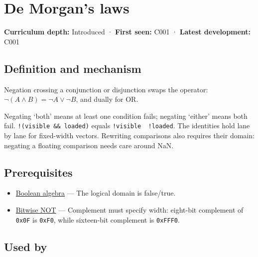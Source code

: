 \hypertarget{appendix-9079d3659da4}{}\label{referencestart:appendix-9079d3659da4}
\section{De Morgan's laws}\label{appendix-9079d3659da4-de-morgans-laws}

\textbf{Curriculum depth:} Introduced · \textbf{First seen:} C001 · \textbf{Latest development:} C001

\begin{allmightroledefinition}

\subsection{Definition and mechanism}\label{appendix-9079d3659da4-definition-and-mechanism}

Negation crossing a conjunction or disjunction swaps the operator: \(\neg(A\land B)=\neg A\lor\neg B\), and dually for OR.

\end{allmightroledefinition}

Negating `both' means at least one condition fails; negating `either' means both fail. \texttt{!(visible\ \&\&\ loaded)} equals \texttt{!visible\ \textbar{}\textbar{}\ !loaded}. The identities hold lane by lane for fixed-width vectors. Rewriting comparisons also requires their domain: negating a floating comparison needs care around NaN.

\subsection{Prerequisites}\label{appendix-9079d3659da4-prerequisites}

\begin{itemize}
\tightlist
\item
  \hyperref[appendix-24475e1596a8]{Boolean algebra} --- The logical domain is false/true.
\item
  \hyperref[appendix-8f38927cfc54]{Bitwise NOT} --- Complement must specify width: eight-bit complement of \texttt{0x0F} is \texttt{0xF0}, while sixteen-bit complement is \texttt{0xFFF0}.
\end{itemize}

\subsection{Used by}\label{appendix-9079d3659da4-used-by}

